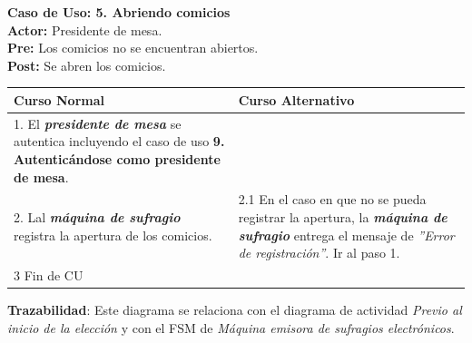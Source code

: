 \documentclass[spanish, 10pt,a4paper]{article}
\numberwithin{equation}{section} %
\begin{document}
\newpage
\noindent\textbf{Caso de Uso: 5. Abriendo comicios}\\
\textbf{Actor: } Presidente de mesa.\\
\textbf{Pre: } Los comicios no se encuentran abiertos.\\
\textbf{Post: } Se abren los comicios.\\
\begin{table}[H]
  \centering
\bgroup
\def\arraystretch{1.3}
  \begin{tabular}{p{9cm} | p{7cm}}
    \hline
    Curso Normal & Curso Alternativo \\
    \hline
    \hline    
        1. El \textbf{\textit{presidente de mesa}} se autentica incluyendo el caso de uso \textbf{ 9. Autenticándose como presidente de mesa}. \\
    \hline
    2. Lal \textbf{\textit{máquina de sufragio}} registra la apertura de los comicios.
    &
    2.1 En el caso en que no se pueda registrar la apertura, la \textbf{\textit{máquina de sufragio}} entrega el mensaje de \textit{''Error de registración''}. Ir al paso 1.
    \\
    
    \hline
    3 Fin de CU
    & \\
    \hline
  \end{tabular}
\egroup
\end{table}
\vspace{-10px}
\noindent\textbf{Trazabilidad}: Este diagrama se relaciona con el diagrama de actividad \textit{Previo al inicio de la elección} y con el FSM de \textit{Máquina emisora de sufragios electrónicos}.\\
\end{document}

